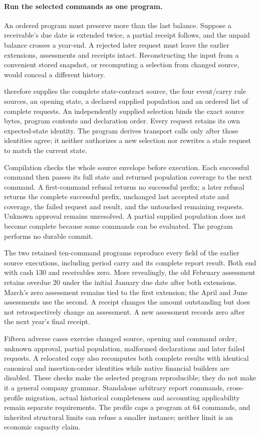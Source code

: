 
\paragraph{Run the selected commands as one program.}
An ordered program must preserve more than the last balance. Suppose a
receivable's due date is extended twice, a partial receipt follows, and the
unpaid balance crosses a year-end. A rejected later request must leave the
earlier extensions, assessments and receipts intact. Reconstructing the input
from a convenient stored snapshot, or recomputing a selection from changed
source, would conceal a different history.

 therefore supplies the complete state-contract
source, the four event/carry rule sources, an opening state, a declared supplied
population and an ordered list of complete requests. An independently supplied
selection binds the exact source bytes, program contents and declaration order.
Every request retains its own expected-state identity. The program derives
transport calls only after those identities agree; it neither authorizes a
new selection nor rewrites a stale request to match the current state.

Compilation checks the whole source envelope before execution. Each successful
command then passes its full state and returned population coverage to the next
command. A first-command refusal returns no successful prefix; a later refusal
returns the complete successful prefix, unchanged last accepted state and
coverage, the failed request and result, and the untouched remaining requests.
Unknown approval remains unresolved. A partial supplied population does not
become complete because some commands can be evaluated. The program performs
no durable commit.

The two retained ten-command programs reproduce every field of the earlier
source executions, including period carry and its complete report result.
Both end with cash 130 and receivables zero. More revealingly, the old February
assessment retains overdue 20 under the initial January due date after both
extensions. March's zero assessment remains tied to the first extension;
the April and June assessments use the second. A receipt changes the amount
outstanding but does not retrospectively change an assessment. A new assessment
records zero after the next year's final receipt.

Fifteen adverse cases exercise changed source, opening and command order,
unknown approval, partial population, malformed declarations and later failed
requests. A relocated copy also recomputes both complete results with identical
canonical and insertion-order identities while native financial builders are
disabled. These checks make the selected program reproducible; they do not
make it a general company grammar. Standalone arbitrary report commands,
cross-profile migration, actual historical completeness and accounting
applicability remain separate requirements. The profile caps a program at
64 commands, and inherited structural limits can refuse a smaller instance;
neither limit is an economic capacity claim.

